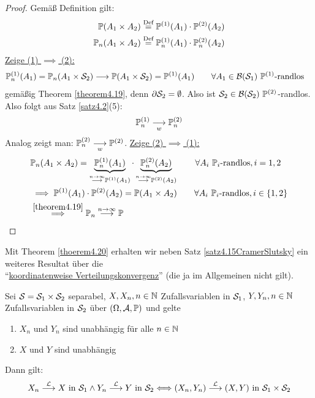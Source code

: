 \begin{proof}
	Gemäß Definition gilt:
	\begin{align*}
		\P(A_1\times A_2)&\stackeq{\text{Def}}\P^{(1)}(A_1)\cdot\P^{(2)}(A_2)\\
		\P_n(A_1\times A_2)&\stackeq{\text{Def}}\P_n^{(1)}(A_1)\cdot\P_n^{(2)}(A_2)\\
	\end{align*}
	\underline{Zeige (1) $\implies$ (2):}
	\begin{align*}
		\P_n^{(1)}(A_1)&=\P_n(A_1\times\S_2)\stackrel{}{\longrightarrow}\P(A_1\times\S_2)=\P^{(1)}(A_1)
		\qquad\forall A_1\in\B(\S_1)~\P^{(1)}\text{-randlos}
	\end{align*}
	gemäßig Theorem \ref{theorem4.19}, denn $\partial\S_2=\emptyset$. 
	Also ist $\S_2\in\B(\S_2)~\P^{(2)}$-randlos. 
	Also folgt aus Satz \ref{satz4.2}(5):
	\begin{align*}
		\P_n^{(1)}\stackrelnew{w}{}{\longrightarrow}\P_n^{(2)}
	\end{align*}
	Analog zeigt man: 
	$\P_n^{(2)}\stackrelnew{w}{}{\longrightarrow}\P^{(2)}$.\nl
	\underline{Zeige (2) $\implies$ (1):}
	\begin{align*}
		&\P_n(A_1\times A_2)=\underbrace{\P_n^{(1)}(A_1)}_{\stackrel{n\to\infty}{\longrightarrow}\P^{(1)}(A_1)}\cdot\underbrace{\P_n^{(2)}(A_2)}_{\stackrel{n\to\infty}{\longrightarrow}\P^{(2)}(A_2)}\qquad\forall A_i~\P_i\text{-randlos},i=1,2\\
		&\implies
		\P^{(1)}(A_1)\cdot\P^{(2)}(A_2)=\P(A_1\times A_2)\qquad\forall A_i~\P_i\text{-randlos},i\in\lbrace1,2\rbrace\\
		&\stackrel{\ref{theorem4.19}}{\implies}\P_n\stackrel{n\to\infty}{\longrightarrow}\P
	\end{align*}
\end{proof}

Mit Theorem \ref{thoerem4.20} erhalten wir neben Satz \ref{satz4.15CramerSlutsky} ein weiteres Resultat über die\\ ``\ul{koordinatenweise Verteilungskonvergenz}'' (die ja im Allgemeinen nicht gilt).

\begin{satz}\label{satz4.21}
	Sei $\S=\S_1\times\S_2$ separabel, $X,X_n,n\in\N$ Zufallsvariablen in $\S_1$, $Y,Y_n,n\in\N$ Zufallsvariablen in $\S_2$ über $(\Omega,\A,\P)$ und gelte
	\begin{enumerate}
		\item $X_n$ und $Y_n$ sind unabhängig für alle $n\in\N$
		\item $X$ und $Y$ sind unabhängig
	\end{enumerate}
	Dann gilt:
	\begin{align*}
		X_n\stackrel{\L}{\longrightarrow} X\text{ in }\S_1\wedge Y_n\stackrel{\L}{\longrightarrow} Y\text{ in }\S_2
		\Longleftrightarrow (X_n,Y_n)\stackrel{\L}{\longrightarrow}(X,Y)\text{ in }\S_1\times\S_2
	\end{align*}
\end{satz}

